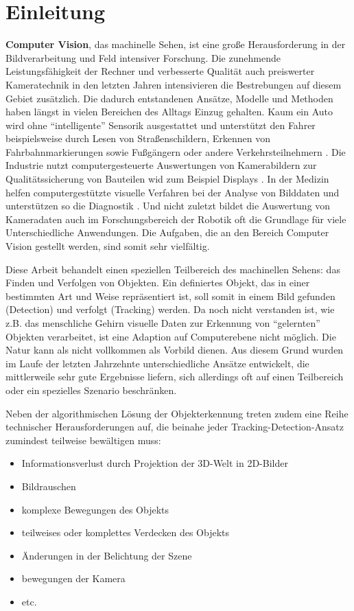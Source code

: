 \section{Einleitung}
\textbf{Computer Vision}, das machinelle Sehen, ist eine große Herausforderung in der Bildverarbeitung und Feld intensiver Forschung. Die zunehmende Leistungsfähigkeit der Rechner und verbesserte Qualität auch preiswerter Kameratechnik in den letzten Jahren intensivieren die Bestrebungen auf diesem Gebiet zusätzlich. Die dadurch entstandenen Ansätze, Modelle und Methoden haben längst in vielen Bereichen des Alltags Einzug gehalten. Kaum ein Auto wird ohne ``intelligente'' Sensorik ausgestattet und unterstützt den Fahrer beispielsweise durch Lesen von Straßenschildern, Erkennen von Fahrbahnmarkierungen sowie Fußgängern oder andere Verkehrsteilnehmern \cite{PED}. Die Industrie nutzt computergesteuerte Auswertungen von Kamerabildern zur Qualitätssicherung von Bauteilen wid zum Beispiel Displays \cite{LCD}. In der Medizin helfen computergestützte visuelle Verfahren bei der Analyse von Bilddaten und unterstützen so die Diagnostik \cite{MIP}. Und nicht zuletzt bildet die Auswertung von Kameradaten auch im Forschungsbereich der Robotik oft die Grundlage für viele Unterschiedliche Anwendungen. Die Aufgaben, die an den Bereich Computer Vision gestellt werden, sind somit sehr vielfältig.

Diese Arbeit behandelt einen speziellen Teilbereich des machinellen Sehens: das Finden und Verfolgen von Objekten. Ein definiertes Objekt, das in einer bestimmten Art und Weise repräsentiert ist, soll somit in einem Bild gefunden (Detection) und verfolgt (Tracking) werden. Da noch nicht verstanden ist, wie z.B. das menschliche Gehirn visuelle Daten zur Erkennung von ``gelernten'' Objekten verarbeitet, ist eine Adaption auf Computerebene nicht möglich. Die Natur kann als nicht vollkommen als Vorbild dienen. Aus diesem Grund wurden im Laufe der letzten Jahrzehnte unterschiedliche Ansätze entwickelt, die mittlerweile sehr gute Ergebnisse liefern, sich allerdings oft auf einen Teilbereich oder ein spezielles Szenario beschränken.

Neben der algorithmischen Lösung der Objekterkennung treten zudem eine Reihe technischer Herausforderungen auf, die beinahe jeder Tracking-Detection-Ansatz zumindest teilweise bewältigen muss: 

\begin{itemize}
\item Informationsverlust durch Projektion der 3D-Welt in 2D-Bilder
\item Bildrauschen
\item komplexe Bewegungen des Objekts
\item teilweises oder komplettes Verdecken des Objekts
\item Änderungen in der Belichtung der Szene
\item bewegungen der Kamera
\item etc.
\end{itemize}

